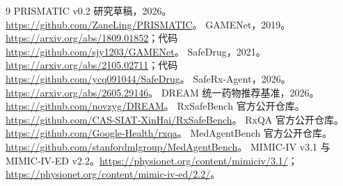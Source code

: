 \documentclass[UTF8,11pt,a4paper]{ctexart}
\begin{document}
\begin{thebibliography}{9}
 PRISMATIC v0.2 研究草稿，2026。\url{https://github.com/ZaneLing/PRISMATIC}。
 GAMENet，2019。\url{https://arxiv.org/abs/1809.01852}；代码 \url{https://github.com/sjy1203/GAMENet}。
 SafeDrug，2021。\url{https://arxiv.org/abs/2105.02711}；代码 \url{https://github.com/ycq091044/SafeDrug}。
 SafeRx-Agent，2026。\url{https://arxiv.org/abs/2605.29146}。
 DREAM 统一药物推荐基准，2026。\url{https://github.com/novzyg/DREAM}。
 RxSafeBench 官方公开仓库。\url{https://github.com/CAS-SIAT-XinHai/RxSafeBench}。
 RxQA 官方公开仓库。\url{https://github.com/Google-Health/rxqa}。
 MedAgentBench 官方公开仓库。\url{https://github.com/stanfordmlgroup/MedAgentBench}。
 MIMIC-IV v3.1 与 MIMIC-IV-ED v2.2。\url{https://physionet.org/content/mimiciv/3.1/}；\url{https://physionet.org/content/mimic-iv-ed/2.2/}。
\end{thebibliography}
\end{document}
